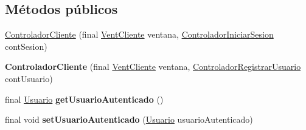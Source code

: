 \subsection*{Métodos públicos}
\begin{DoxyCompactItemize}
\item 
\hyperlink{classcom_1_1ucab_1_1javachat_1_1_cliente_1_1controller_1_1_controlador_cliente_a169ce22e78795bc739fde02d29afbf5a}{Controlador\-Cliente} (final \hyperlink{classcom_1_1ucab_1_1javachat_1_1_cliente_1_1view_1_1_vent_cliente}{Vent\-Cliente} ventana, \hyperlink{classcom_1_1ucab_1_1javachat_1_1_cliente_1_1controller_1_1_controlador_iniciar_sesion}{Controlador\-Iniciar\-Sesion} cont\-Sesion)
\item 
\hypertarget{classcom_1_1ucab_1_1javachat_1_1_cliente_1_1controller_1_1_controlador_cliente_ae11bb33a2245f1000c5df1834a360746}{{\bfseries Controlador\-Cliente} (final \hyperlink{classcom_1_1ucab_1_1javachat_1_1_cliente_1_1view_1_1_vent_cliente}{Vent\-Cliente} ventana, \hyperlink{classcom_1_1ucab_1_1javachat_1_1_cliente_1_1controller_1_1_controlador_registrar_usuario}{Controlador\-Registrar\-Usuario} cont\-Usuario)}\label{classcom_1_1ucab_1_1javachat_1_1_cliente_1_1controller_1_1_controlador_cliente_ae11bb33a2245f1000c5df1834a360746}

\item 
\hypertarget{classcom_1_1ucab_1_1javachat_1_1_cliente_1_1controller_1_1_controlador_cliente_a12ea6a6be82d2b5ce6bcc1fc6d4f3a73}{final \hyperlink{classcom_1_1ucab_1_1javachat_1_1_cliente_1_1model_1_1_usuario}{Usuario} {\bfseries get\-Usuario\-Autenticado} ()}\label{classcom_1_1ucab_1_1javachat_1_1_cliente_1_1controller_1_1_controlador_cliente_a12ea6a6be82d2b5ce6bcc1fc6d4f3a73}

\item 
\hypertarget{classcom_1_1ucab_1_1javachat_1_1_cliente_1_1controller_1_1_controlador_cliente_a32c622eb684b582d03d81ae98bf8be49}{final void {\bfseries set\-Usuario\-Autenticado} (\hyperlink{classcom_1_1ucab_1_1javachat_1_1_cliente_1_1model_1_1_usuario}{Usuario} usuario\-Autenticado)}\label{classcom_1_1ucab_1_1javachat_1_1_cliente_1_1controller_1_1_controlador_cliente_a32c622eb684b582d03d81ae98bf8be49}


\end{DoxyCompactItemize}
